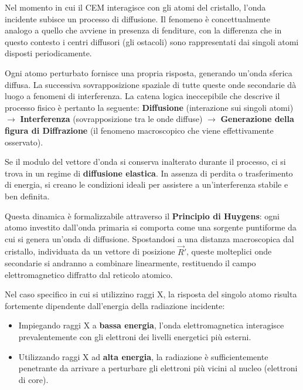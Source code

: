 Nel momento in cui il CEM interagisce con gli atomi del cristallo, l'onda incidente subisce un processo di diffusione. Il fenomeno è concettualmente analogo a quello che avviene in presenza di fenditure, con la differenza che in questo contesto i centri diffusori (gli ostacoli) sono rappresentati dai singoli atomi disposti periodicamente. 

Ogni atomo perturbato fornisce una propria risposta, generando un'onda sferica diffusa. La successiva sovrapposizione spaziale di tutte queste onde secondarie dà luogo a fenomeni di interferenza. La catena logica ineccepibile che descrive il processo fisico è pertanto la seguente:
\textbf{Diffusione} (interazione sui singoli atomi) \( \rightarrow \) \textbf{Interferenza} (sovrapposizione tra le onde diffuse) \( \rightarrow \) \textbf{Generazione della figura di Diffrazione} (il fenomeno macroscopico che viene effettivamente osservato).

Se il modulo del vettore d'onda si conserva inalterato durante il processo, ci si trova in un regime di \textbf{diffusione elastica}. In assenza di perdita o trasferimento di energia, si creano le condizioni ideali per assistere a un'interferenza stabile e ben definita.

Questa dinamica è formalizzabile attraverso il \textbf{Principio di Huygens}: ogni atomo investito dall'onda primaria si comporta come una sorgente puntiforme da cui si genera un'onda di diffusione. Spostandosi a una distanza macroscopica dal cristallo, individuata da un vettore di posizione \( \vec{R}' \), queste molteplici onde secondarie si andranno a combinare linearmente, restituendo il campo elettromagnetico diffratto dal reticolo atomico.

Nel caso specifico in cui si utilizzino raggi X, la risposta del singolo atomo risulta fortemente dipendente dall'energia della radiazione incidente:
\begin{itemize}
    \item Impiegando raggi X a \textbf{bassa energia}, l'onda elettromagnetica interagisce prevalentemente con gli elettroni dei livelli energetici più esterni.
    \item Utilizzando raggi X ad \textbf{alta energia}, la radiazione è sufficientemente penetrante da arrivare a perturbare gli elettroni più vicini al nucleo (elettroni di core).
\end{itemize}

